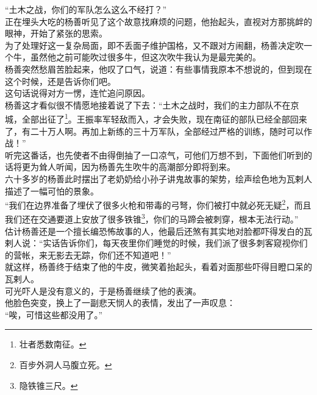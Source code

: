\begin{multicols}{\theparacolNo}
“土木之战，你们的军队怎么这么不经打？”\\

正在埋头大吃的杨善听见了这个故意找麻烦的问题，他抬起头，直视对方那挑衅的眼神，开始了紧张的思索。\\

为了处理好这一复杂局面，即不丢面子维护国格，又不跟对方闹翻，杨善决定吹一个牛，虽然他之前可能吹过很多牛，但这次吹牛我认为是最完美的。\\

杨善突然愁眉苦脸起来，他叹了口气，说道：有些事情我原本不想说的，但到现在这个时候，还是告诉你们吧。\\

这句话说得对方一愣，连忙追问原因。\\

杨善这才看似很不情愿地接着说了下去：“土木之战时，我们的主力部队不在京城，全部出征了\footnote{壮者悉数南征。}。王振率军轻敌而入，才会失败，现在南征的部队已经全部回来了，有二十万人啊。再加上新练的三十万军队，全部经过严格的训练，随时可以作战！”\\

听完这番话，也先使者不由得倒抽了一口凉气，可他们万想不到，下面他们听到的话将更为耸人听闻，因为杨善先生吹牛的高潮部分即将到来。\\

六十多岁的杨善此时摆出了老奶奶给小孙子讲鬼故事的架势，绘声绘色地为瓦剌人描述了一幅可怕的景象。\\

“我们在边界准备了埋伏了很多火枪和带毒的弓弩，你们被打中就必死无疑\footnote{百步外洞人马腹立死。}，而且我们还在交通要道上安放了很多铁锥\footnote{隐铁锥三尺。}，你们的马蹄会被刺穿，根本无法行动。”\\

估计杨善还是一个擅长编恐怖故事的人，他最后还煞有其实地对脸都吓得发白的瓦剌人说：“实话告诉你们，每天夜里你们睡觉的时候，我们派了很多刺客窥视你们的营帐，来无影去无踪，你们还不知道吧！”\\

就这样，杨善终于结束了他的牛皮，微笑着抬起头，看着对面那些吓得目瞪口呆的瓦剌人。\\

可光吓人是没有意义的，于是杨善继续了他的表演。\\

他脸色突变，换上了一副悲天悯人的表情，发出了一声叹息：\\

“唉，可惜这些都没用了。”\\


\end{multicols}
